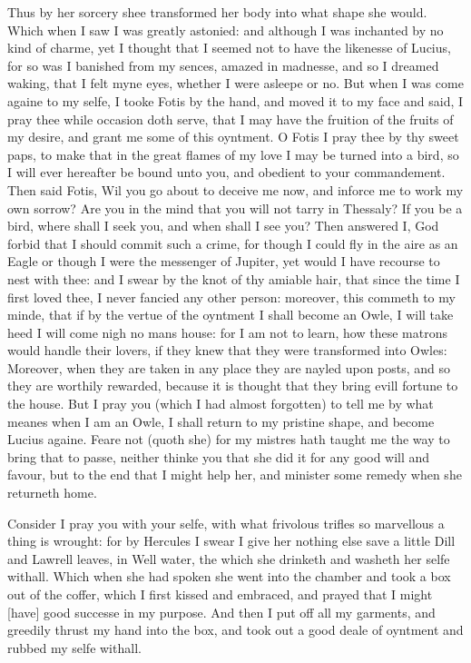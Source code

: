 Thus by her sorcery shee transformed her body into what shape she would. Which
when I saw I was greatly astonied: and although I was inchanted by no kind of
charme, yet I thought that I seemed not to have the likenesse of Lucius, for so
was I banished from my sences, amazed in madnesse, and so I dreamed waking,
that I felt myne eyes, whether I were asleepe or no. But when I was come againe
to my selfe, I tooke Fotis by the hand, and moved it to my face and said, I
pray thee while occasion doth serve, that I may have the fruition of the fruits
of my desire, and grant me some of this oyntment. O Fotis I pray thee by thy
sweet paps, to make that in the great flames of my love I may be turned into a
bird, so I will ever hereafter be bound unto you, and obedient to your
commandement. Then said Fotis, Wil you go about to deceive me now, and inforce
me to work my own sorrow? Are you in the mind that you will not tarry in
Thessaly? If you be a bird, where shall I seek you, and when shall I see you?
Then answered I, God forbid that I should commit such a crime, for though I
could fly in the aire as an Eagle or though I were the messenger of Jupiter,
yet would I have recourse to nest with thee: and I swear by the knot of thy
amiable hair, that since the time I first loved thee, I never fancied any other
person: moreover, this commeth to my minde, that if by the vertue of the
oyntment I shall become an Owle, I will take heed I will come nigh no mans
house: for I am not to learn, how these matrons would handle their lovers, if
they knew that they were transformed into Owles: Moreover, when they are taken
in any place they are nayled upon posts, and so they are worthily rewarded,
because it is thought that they bring evill fortune to the house. But I pray
you (which I had almost forgotten) to tell me by what meanes when I am an Owle,
I shall return to my pristine shape, and become Lucius againe. Feare not (quoth
she) for my mistres hath taught me the way to bring that to passe, neither
thinke you that she did it for any good will and favour, but to the end that I
might help her, and minister some remedy when she returneth home.

Consider I pray you with your selfe, with what frivolous trifles so marvellous
a thing is wrought: for by Hercules I swear I give her nothing else save a
little Dill and Lawrell leaves, in Well water, the which she drinketh and
washeth her selfe withall. Which when she had spoken she went into the chamber
and took a box out of the coffer, which I first kissed and embraced, and prayed
that I might [have] good successe in my purpose. And then I put off all my
garments, and greedily thrust my hand into the box, and took out a good deale
of oyntment and rubbed my selfe withall.

